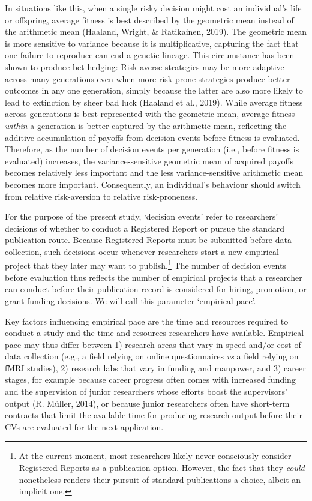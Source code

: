 \documentclass[
  ,man,mask,floatsintext]{apa6}
\begin{document}
In situations like this, when a single risky decision might cost an individual's life or offspring, average fitness is best described by the geometric mean instead of the arithmetic mean (Haaland, Wright, \& Ratikainen, 2019).
The geometric mean is more sensitive to variance because it is multiplicative, capturing the fact that one failure to reproduce can end a genetic lineage.
This circumstance has been shown to produce bet-hedging:
Risk-averse strategies may be more adaptive across many generations even when more risk-prone strategies produce better outcomes in any one generation, simply because the latter are also more likely to lead to extinction by sheer bad luck (Haaland et al., 2019).
While average fitness across generations is best represented with the geometric mean, average fitness \emph{within} a generation is better captured by the arithmetic mean, reflecting the additive accumulation of payoffs from decision events before fitness is evaluated.
Therefore, as the number of decision events per generation (i.e., before fitness is evaluated) increases, the variance-sensitive geometric mean of acquired payoffs becomes relatively less important and the less variance-sensitive arithmetic mean becomes more important.
Consequently, an individual's behaviour should switch from relative risk-aversion to relative risk-proneness.

For the purpose of the present study, `decision events' refer to researchers' decisions of whether to conduct a Registered Report or pursue the standard publication route.
Because Registered Reports must be submitted before data collection, such decisions occur whenever researchers start a new empirical project that they later may want to publish.\footnote{At the current moment, most researchers likely never consciously consider Registered Reports as a publication option. However, the fact that they \emph{could} nonetheless renders their pursuit of standard publications a choice, albeit an implicit one.}
The number of decision events before evaluation thus reflects the number of empirical projects that a researcher can conduct before their publication record is considered for hiring, promotion, or grant funding decisions.
We will call this parameter `empirical pace'.

Key factors influencing empirical pace are the time and resources required to conduct a study and the time and resources researchers have available.
Empirical pace may thus differ between 1) research areas that vary in speed and/or cost of data collection (e.g., a field relying on online questionnaires \emph{vs} a field relying on fMRI studies), 2) research labs that vary in funding and manpower, and 3) career stages, for example because career progress often comes with increased funding and the supervision of junior researchers whose efforts boost the supervisors' output (R. Müller, 2014), or because junior researchers often have short-term contracts that limit the available time for producing research output before their CVs are evaluated for the next application.
\end{document}
